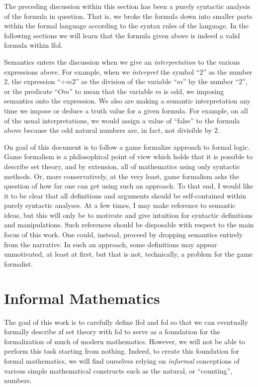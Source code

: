 \documentclass[12pt]{article}
\theoremstyle{break}
\theoremstyle{break}
\theoremstyle{break}
\theoremstyle{break}
\theoremstyle{break}
\newtheorem{informal definition}[definition]{Informal Definition}
\theoremstyle{break}
\newtheorem{informal theorem}[theorem]{Informal Theorem}
\newcommand{\qq}[1]{``#1''}
\begin{document}
The preceding discussion within this section has been a purely syntactic analysis of the formula in question.
That is, we broke the formula down into smaller parts within the formal language according to the syntax rules of the language.
In the following sections we will learn that the formula given above is indeed a valid formula within \gls{lfol}.

Semantics enters the discussion when we give an \textit{interpretation} to the various expressions above.
For example, when we \textit{interpret} the symbol \qq{2} as the number 2, the expression \qq{$\div m 2$} as the division of the variable \qq{$m$} by the number \qq{2}, or the predicate \qq{$Om$} to mean that the variable $m$ is odd, we imposing semantics onto the expression.
We also are making a semantic interpretation any time we impose or deduce a truth value for a given formula.
For example, on all of the usual interpretations, we would assign a value of \qq{false} to the formula above because the odd natural numbers are, in fact, not divisible by 2.

On goal of this document is to follow a game formalize approach to formal logic.
Game formalism is a philosophical point of view which holds that it is possible to describe set theory, and by extension, all of mathematics using only syntactic methods.
Or, more conservatively, at the very least, game formalism asks the question of how far one can get using such an approach.
To that end, I would like it to be clear that all definitions and arguments should be self-contained within purely syntactic analyses.
At a few times, I may make reference to semantic ideas, but this will only be to motivate and give intuition for syntactic definitions and manipulations.
Such references should be disposable with respect to the main focus of this work.
One could, instead, proceed by dropping semantics entirely from the narrative.
In such an approach, some definitions may appear unmotivated, at least at first, but that is not, technically, a problem for the game formalist.


\section{Informal Mathematics}

The goal of this work is to carefully define \gls{lfol} and \gls{fol} so that we can eventually formally describe \gls{zf} set theory with \gls{fol} to serve as a foundation for the formalization of much of modern mathematics.
However, we will not be able to perform this task starting from nothing.
Indeed, to create this foundation for formal mathematics, we will find ourselves relying on \textit{informal} conceptions of various simple mathematical constructs such as the natural, or \qq{counting}, numbers.
\end{document}
